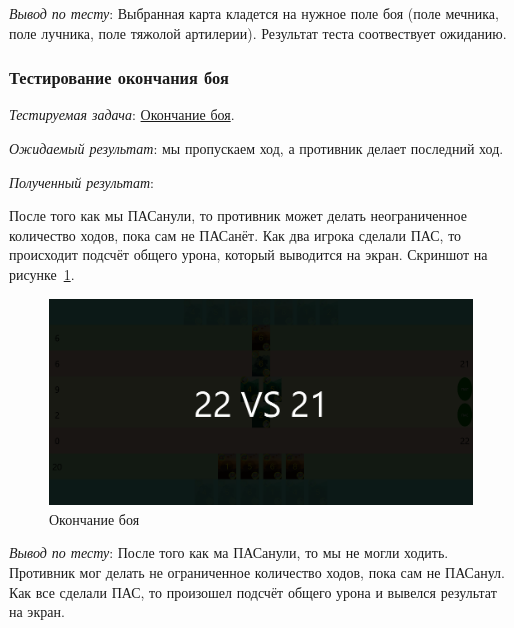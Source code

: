 \documentclass[12pt, a4paper, simple]{eskdtext}
\begin{document}
    \textit{Вывод по тесту}: Выбранная карта кладется на нужное поле боя (поле мечника, поле лучника, поле тяжолой артилерии).
    Результат теста соотвествует ожиданию.


    \newpage
    \subsubsection*{Тестирование окончания боя}

    \textit{Тестируемая задача}: \underline{Окончание боя}.
    
    \textit{Ожидаемый результат}: мы пропускаем ход, а противник делает последний ход.
    
    \textit{Полученный результат}:

    После того как мы ПАСанули, то противник может делать неограниченное количество ходов, пока сам не ПАСанёт.
    Как два игрока сделали ПАС, то происходит подсчёт общего урона, который выводится на экран.
    Скриншот на рисунке~\ref{fig:test_finish_game}.

    \begin{figure}[!h]
        \centering
        \includegraphics[width=12cm]
            {_assets/finish_game.png}
        \caption{Окончание боя}
        \label{fig:test_finish_game}
    \end{figure}

    \textit{Вывод по тесту}: После того как ма ПАСанули, то мы не могли ходить.
    Противник мог делать не ограниченное количество ходов,
    пока сам не ПАСанул.
    Как все сделали ПАС, то произошел подсчёт общего урона и вывелся результат на экран.

    \newpage

    \newpage
\end{document}
